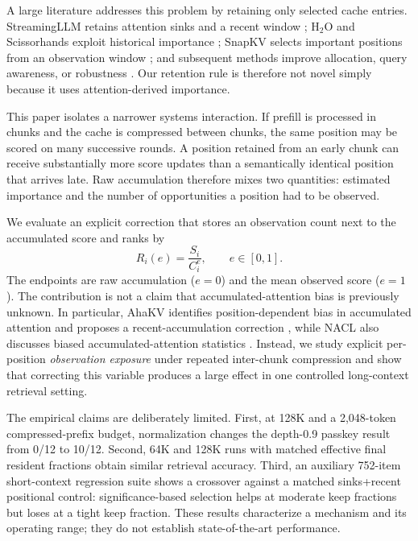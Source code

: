 \documentclass[10pt,twocolumn]{article}
\begin{document}
A large literature addresses this problem by retaining only selected cache entries. StreamingLLM retains attention sinks and a recent window \citep{xiao2023streamingllm}; H$_2$O and Scissorhands exploit historical importance \citep{zhang2023h2o,liu2023scissorhands}; SnapKV selects important positions from an observation window \citep{li2024snapkv}; and subsequent methods improve allocation, query awareness, or robustness \citep{chen2024nacl,cai2024pyramidkv,tang2024quest,gu2025ahakv,kim2025kvzip}. Our retention rule is therefore not novel simply because it uses attention-derived importance.

This paper isolates a narrower systems interaction. If prefill is processed in chunks and the cache is compressed between chunks, the same position may be scored on many successive rounds. A position retained from an early chunk can receive substantially more score updates than a semantically identical position that arrives late. Raw accumulation therefore mixes two quantities: estimated importance and the number of opportunities a position had to be observed.

We evaluate an explicit correction that stores an observation count next to the accumulated score and ranks by
\begin{equation}
R_i(e)=\frac{S_i}{C_i^e},\qquad e\in[0,1].
\end{equation}
The endpoints are raw accumulation ($e=0$) and the mean observed score ($e=1$). The contribution is not a claim that accumulated-attention bias is previously unknown. In particular, AhaKV identifies position-dependent bias in accumulated attention and proposes a recent-accumulation correction \citep{gu2025ahakv}, while NACL also discusses biased accumulated-attention statistics \citep{chen2024nacl}. Instead, we study explicit per-position \emph{observation exposure} under repeated inter-chunk compression and show that correcting this variable produces a large effect in one controlled long-context retrieval setting.

The empirical claims are deliberately limited. First, at 128K and a 2,048-token compressed-prefix budget, normalization changes the depth-0.9 passkey result from 0/12 to 10/12. Second, 64K and 128K runs with matched effective final resident fractions obtain similar retrieval accuracy. Third, an auxiliary 752-item short-context regression suite shows a crossover against a matched sinks+recent positional control: significance-based selection helps at moderate keep fractions but loses at a tight keep fraction. These results characterize a mechanism and its operating range; they do not establish state-of-the-art performance.
\end{document}
